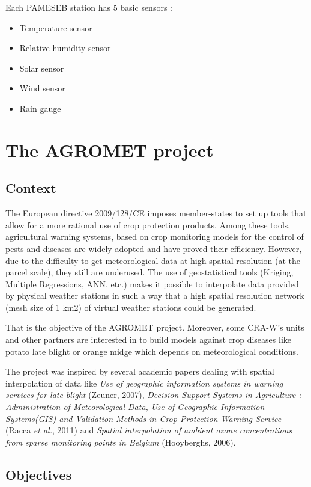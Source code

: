 \documentclass[12pt,twoside]{reedthesis}
\providecommand{\tightlist}{%
  \setlength{\itemsep}{0pt}\setlength{\parskip}{0pt}}
\theoremstyle{definition}
\theoremstyle{definition}
\theoremstyle{definition}
\theoremstyle{remark}
\begin{document}
Each PAMESEB station has 5 basic sensors :
\begin{itemize}
\tightlist
\item
  Temperature sensor
\item
  Relative humidity sensor
\item
  Solar sensor
\item
  Wind sensor
\item
  Rain gauge
\end{itemize}
\section{The AGROMET project}\label{the-agromet-project}

\subsection{Context}\label{context}

The European directive 2009/128/CE imposes member-states to set up tools
that allow for a more rational use of crop protection products. Among
these tools, agricultural warning systems, based on crop monitoring
models for the control of pests and diseases are widely adopted and have
proved their efficiency. However, due to the difficulty to get
meteorological data at high spatial resolution (at the parcel scale),
they still are underused. The use of geostatistical tools (Kriging,
Multiple Regressions, ANN, etc.) makes it possible to interpolate data
provided by physical weather stations in such a way that a high spatial
resolution network (mesh size of 1 km2) of virtual weather stations
could be generated.

That is the objective of the AGROMET project. Moreover, some CRA-W's
units and other partners are interested in to build models against crop
diseases like potato late blight or orange midge which depends on
meteorological conditions.

The project was inspired by several academic papers dealing with spatial
interpolation of data like \emph{Use of geographic information systems
in warning services for late blight} (Zeuner, 2007), \emph{Decision
Support Systems in Agriculture : Administration of Meteorological Data,
Use of Geographic Information Systems(GIS) and Validation Methods in
Crop Protection Warning Service} (Racca \emph{et al.}, 2011) and
\emph{Spatial interpolation of ambient ozone concentrations from sparse
monitoring points in Belgium} (Hooyberghs, 2006).

\subsection{Objectives}\label{objectives}
\end{document}
